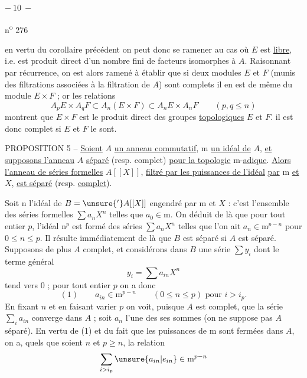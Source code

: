 
\begin{center}$-\ 10\ -$\end{center}\hfill n\textsuperscript{o} 276

en vertu du corollaire précédent on peut donc se ramener au cas où $E$ est \uline{libre}, i.e. est produit direct d'un nombre fini de facteurs isomorphes à $A$. Raisonnant par récurrence, on est alors ramené à établir que si deux modules $E$ et $F$ (munis des filtrations associées à la filtration de $A$) sont complets il en est de même du module $E\times F$ ; or les relations
\[
A_pE\times A_qF\subset A_n(E\times F)\subset A_nE\times A_nF\qquad(p,q\leqslant n)
\]
montrent que $E\times F$ est le produit direct des groupes \uline{topologiques} $E$ et $F$. il est donc complet si $E$ et $F$ le sont.

PROPOSITION 5 -- \uline{Soient} $A$ \uline{un anneau commutatif}, $\mathrm m$ \uline{un idéal de} $A$, \uline{et supposons l'anneau} $A$ \uline{séparé} (resp. complet) \uline{pour la topologie} $\mathrm m$-\uline{adique}. \uline{Alors l'anneau de séries formelles} $A[[X]]$, \uline{filtré par les puissances de l'idéal}  \uline{par} $\mathrm m$ \uline{et} $X$, \uline{est séparé} (resp. \uline{complet}).

Soit $\mathrm n$ l'idéal de $B=\unsure{'}A[[X]]$ engendré par $\mathrm m$ et $X$ : c'est l'ensemble des séries formelles $\sum a_nX^n$ telles que $a_0\in\mathrm m$. On déduit de là que pour tout entier $p$, l'idéal $\mathrm n^p$ est formé des séries $\sum a_nX^n$ telles que l'on ait $a_n\in\mathrm m^{p-n}$ pour $0\leqslant n\leqslant p$. Il résulte immédiatement de là que $B$ est séparé si $A$ est séparé. Supposons de plus $A$ complet, et considérons dans $B$ une série $\sum y_i$ dont le terme général
\[
y_i=\sum a_{in}X^n
\]
tend vers $0$ ; pour tout entier $p$ on a donc
\[
(1)\qquad a_{in}\in\mathrm m^{p-n}\qquad(0\leqslant n\leqslant p)\text{ pour }i>i_p.
\]
En fixant $n$ et en faisant varier $p$ on voit, puisque $A$ est complet, que la série $\sum_i a_{in}$ converge dans $A$ ; soit $a_n$ l'une des ses sommes (on ne suppose pas $A$ séparé). En vertu de (1) et du fait que les puissances de $\mathrm m$ sont fermées dans $A$, on a, quels que soient $n$ et $p\geqslant n$, la relation
\[
\sum_{i>i_p}\unsure{a_{in}|e_{in}}\in\mathrm m^{p-n}
\]

